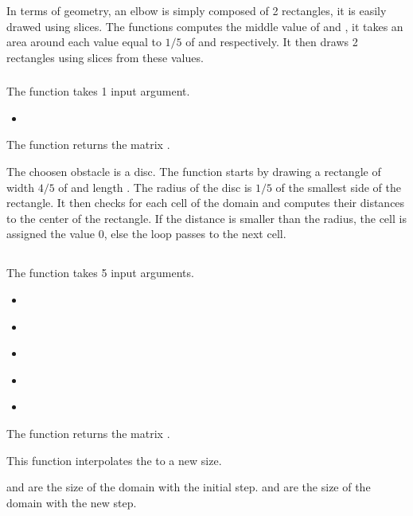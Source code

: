In terms of geometry, an elbow is simply composed of 2 rectangles, it is easily
drawed using slices. The functions computes the middle value of  and
, it takes an area around each value equal to $1/5$ of  and
 respectively. It then draws 2 rectangles using slices from these
values.

\subsubsection{}
The function \textcolor{func}{} takes 1 input argument.
\begin{itemize}
      \item {} \textcolor{dtype}{}
\end{itemize}
The function returns the matrix .

The choosen obstacle is a disc. The function starts by drawing a rectangle of
width $4/5$ of  and length . The radius of the disc is $1/5$ of
the smallest side of the rectangle. It then checks for each cell of the domain
and computes their distances to the center of the rectangle. If the distance is
smaller than the radius, the cell is assigned the value 0, else the loop passes
to the next cell.

\subsection{}
\subsubsection{}
The function \textcolor{func}{} takes 5 input arguments.
\begin{itemize}
      \item {} \textcolor{dtype}{}
      \item {} \textcolor{dtype}{}
      \item {} \textcolor{dtype}{}
      \item {} \textcolor{dtype}{}
      \item {} \textcolor{dtype}{}
\end{itemize}
The function returns the matrix .

This function interpolates the  to a new size.

 and  are  the size of the domain with the initial
step.  and  are  the size of the domain with
the new step.


